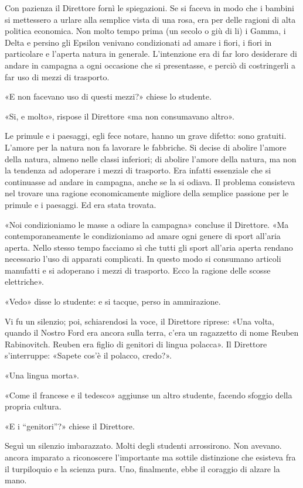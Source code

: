 \documentclass[
a5paper, %
10pt, %
twoside, 
onecolumn, %
openany, %
]{memoir}
\begin{document}
Con pazienza il Direttore fornì le spiegazioni. Se si faceva in modo che i bambini si mettessero a urlare alla semplice vista di una rosa, era per delle ragioni di alta politica economica. Non molto tempo prima (un secolo o giù di li) i Gamma, i Delta e persino gli Epsilon venivano condizionati ad amare i fiori, i fiori in particolare e l’aperta natura in generale. L’intenzione era di far loro desiderare di andare in campagna a ogni occasione che si presentasse, e perciò di costringerli a far uso di mezzi di trasporto.

«E non facevano uso di questi mezzi?» chiese lo studente.

«Si, e molto», rispose il Direttore «ma non consumavano altro».

Le primule e i paesaggi, egli fece notare, hanno un grave difetto: sono gratuiti. L’amore per la natura non fa lavorare le fabbriche. Si decise di abolire l’amore della natura, almeno nelle classi inferiori; di abolire l’amore della natura, ma non la tendenza ad adoperare i mezzi di trasporto. Era infatti essenziale che si continuasse ad andare in campagna, anche se la si odiava. Il problema consisteva nel trovare una ragione economicamente migliore della semplice passione per le primule e i paesaggi. Ed era stata trovata.

«Noi condizioniamo le masse a odiare la campagna» concluse il Direttore. «Ma contemporaneamente le condizioniamo ad amare ogni genere di sport all’aria aperta. Nello stesso tempo facciamo sì che tutti gli sport all’aria aperta rendano necessario l’uso di apparati complicati. In questo modo si consumano articoli manufatti e si adoperano i mezzi di trasporto. Ecco la ragione delle scosse elettriche».

«Vedo» disse lo studente: e si tacque, perso in ammirazione.

Vi fu un silenzio; poi, schiarendosi la voce, il Direttore riprese: «Una volta, quando il Nostro Ford era ancora sulla terra, c’era un ragazzetto di nome Reuben Rabinovitch. Reuben era figlio di genitori di lingua polacca». Il Direttore s’interruppe: «Sapete cos’è il polacco, credo?».

«Una lingua morta».

«Come il francese e il tedesco» aggiunse un altro studente, facendo sfoggio della propria cultura.

«E i “genitori”?» chiese il Direttore.

Seguì un silenzio imbarazzato. Molti degli studenti arrossirono. Non avevano. ancora imparato a riconoscere l’importante ma sottile distinzione che esisteva fra il turpiloquio e la scienza pura. Uno, finalmente, ebbe il coraggio di alzare la mano.
\end{document}

